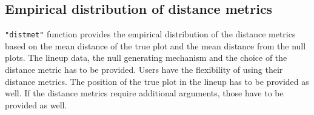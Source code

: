 \subsection{Empirical distribution of distance
metrics}\label{distribution-of-distance-metrics}

 \texttt{"distmet"} function provides
the empirical distribution of the distance metrics based on the mean
distance of the true plot and the mean distance from the null plots. The
lineup data, the null generating mechanism and the choice of the
distance metric has to be provided. Users have the flexibility of using
their distance metrics. The position of the true plot in the lineup has
to be provided as well. If the distance metrics require additional
arguments, those have to be provided as well.

%
%


